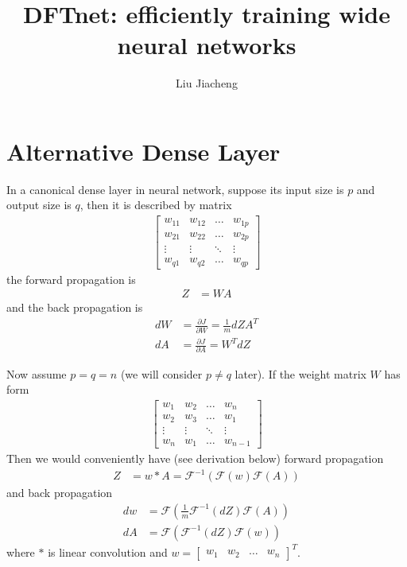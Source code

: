 \documentclass[12pt]{article}
\title{DFTnet: efficiently training wide neural networks}
\author{Liu Jiacheng}
\begin{document}
\maketitle

\section{Alternative Dense Layer}

In a canonical dense layer in neural network, suppose its input size is $p$ and output size is $q$, then it is described by matrix
\begin{align*}
	\begin{bmatrix}
		w_{11} & w_{12} & \hdots & w_{1p} \\
		w_{21} & w_{22} & \hdots & w_{2p} \\
		\vdots & \vdots & \ddots & \vdots \\
		w_{q1} & w_{q2} & \hdots & w_{qp}
	\end{bmatrix}
\end{align*}
the forward propagation is
\begin{align*}
	Z &= W A
\end{align*}
and the back propagation is
\begin{align*}
	dW &= \frac{\partial{J}}{\partial{W}} = \frac{1}{m} dZ A^T \\
	dA &= \frac{\partial{J}}{\partial{A}} = W^T dZ
\end{align*}

Now assume $p=q=n$ (we will consider $p \neq q$ later). If the weight matrix $W$ has form
\begin{align*}
	\begin{bmatrix}
		w_1 & w_2 & \hdots & w_n \\
		w_2 & w_3 & \hdots & w_1 \\
		\vdots & \vdots & \ddots & \vdots \\
		w_n & w_1 & \hdots & w_{n-1}
	\end{bmatrix}
\end{align*}
Then we would conveniently have (see derivation below) forward propagation
\begin{align*}
	Z &= w * A = \mathscr{F}^{-1}(\mathscr{F}(w) \mathscr{F}(A))
\end{align*}
and back propagation
\begin{align*}
	dw &= \mathscr{F}(\frac{1}{m} \mathscr{F}^{-1}(dZ) \mathscr{F}(A)) \\
	dA &= \mathscr{F}(\mathscr{F}^{-1}(dZ) \mathscr{F}(w))
\end{align*}
where $*$ is linear convolution and $w = \begin{bmatrix} w_1 & w_2 & \hdots & w_n \end{bmatrix}^T$. 
\end{document}
